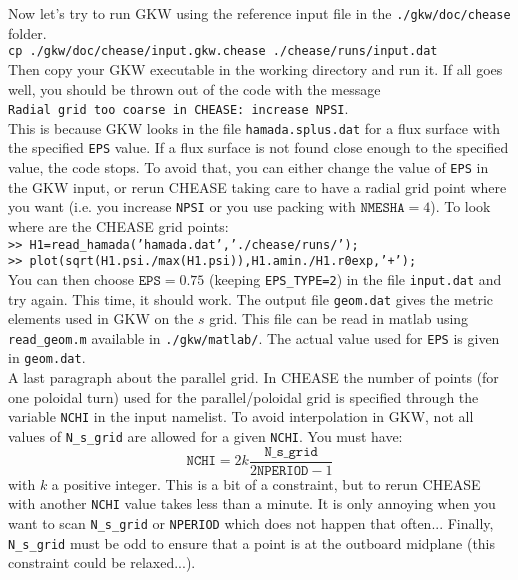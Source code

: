 \documentclass[a4paper,12pt]{article}
\begin{document}
Now let's try to run GKW using the reference input file in the \texttt{./gkw/doc/chease} folder.\\
\texttt{\small cp ./gkw/doc/chease/input.gkw.chease ./chease/runs/input.dat}\\
Then copy your GKW executable in the working directory and run it. If all goes well, you should be thrown out of the code with the message\\
\texttt{Radial grid too coarse in CHEASE: increase NPSI}.\\
This is because GKW looks in the file \texttt{hamada.splus.dat} for a flux surface with the specified \texttt{EPS} value. If a flux surface is not found close enough to the specified value, the code stops. To avoid that, you can either change the value of \texttt{EPS} in the GKW input, or rerun CHEASE taking care to have a radial grid point where you want (i.e. you increase \texttt{NPSI} or you use packing with $\texttt{NMESHA}=4$). To look where are the CHEASE grid points:\\
\texttt{\small >> H1=read\_hamada('hamada.dat','./chease/runs/');}\\
\texttt{\small >> plot(sqrt(H1.psi./max(H1.psi)),H1.amin./H1.r0exp,'+');}\\
You can then choose $\texttt{EPS}=0.75$ (keeping \texttt{EPS\_TYPE=2}) in the file \texttt{input.dat} and try again. This time, it should work. The output file \texttt{geom.dat} gives the metric elements used in GKW on the $s$ grid. This file can be read in matlab using \texttt{read\_geom.m} available in \texttt{./gkw/matlab/}. The actual value used for \texttt{EPS} is given in \texttt{geom.dat}.\\

A last paragraph about the parallel grid. In CHEASE the number of points (for one poloidal turn) used for the parallel/poloidal grid is specified through the variable \texttt{NCHI} in the input namelist. To avoid interpolation in GKW, not all values of \texttt{N\_s\_grid} are allowed for a given \texttt{NCHI}. You must have: $$\texttt{NCHI}=2k \frac{\texttt{N\_s\_grid}}{2\texttt{NPERIOD}-1}$$
with $k$ a positive integer. This is a bit of a constraint, but to rerun CHEASE with another \texttt{NCHI} value takes less than a minute. It is only annoying when you want to scan \texttt{N\_s\_grid} or \texttt{NPERIOD} which does not happen that often...
Finally, \texttt{N\_s\_grid} must be odd to ensure that a point is at the outboard midplane (this constraint could be relaxed...).


\end{document}
